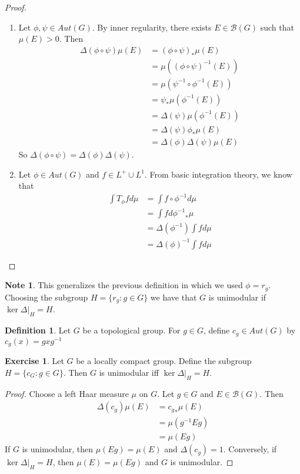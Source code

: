 \documentclass[12pt]{amsart}
\theoremstyle{definition}
\newtheorem{defn}[definition]{Definition}
\newtheorem{note}[definition]{Note}
\newtheorem{ex}[definition]{Exercise}
\newcommand{\Del}{\Delta}
\newcommand{\MB}{\mathcal{B}}
\begin{document}
	\begin{proof} \
		\begin{enumerate}
			\item Let $\phi, \psi \in Aut(G)$. By inner regularity, there exists $E \in \MB(G)$ such that $\mu(E) > 0$. Then 
			\begin{align*}
				\Del(\phi \circ \psi) \mu(E) 
				& = (\phi \circ \psi)_*\mu(E) \\
				& = \mu( (\phi \circ \psi)^{-1}(E) ) \\
				& = \mu(\psi^{-1} \circ \phi^{-1}(E)) \\
				& = \psi_* \mu(\phi^{-1}(E)) \\
				& = \Del(\psi) \mu(\phi^{-1}(E)) \\
				& = \Del(\psi) \phi_* \mu(E) \\
				& = \Del(\phi) \Del(\psi) \mu(E)
			\end{align*}
		So $\Del(\phi \circ \psi) = \Del(\phi) \Del(\psi)$.
			\item Let $\phi \in Aut(G)$ and $f \in L^+ \cup L^1$. From basic integration theory, we know that 
			\begin{align*}
				\int T_{\phi} f d \mu
				& = \int f \circ \phi^{-1} d \mu \\
				& = \int f d {\phi^{-1}}_* \mu \\
				& = \Del(\phi^{-1}) \int f d \mu \\
				& = \Del(\phi)^{-1} \int f d \mu
			\end{align*}
		\end{enumerate}
	\end{proof}
	
	\begin{note}
		This generalizes the previous definition in which we used $\phi = r_g$. Choosing the subgroup $H = \{r_g: g \in G\}$ we have that $G$ is unimodular if $\ker \Del|_H = H$. 
	\end{note}

	\begin{defn}
		Let $G$ be a topological group. For $g \in G$, define $c_g \in Aut(G)$ by $c_g(x) = gxg^{-1}$
	\end{defn}

	\begin{ex}
		Let $G$ be a locally compact group. Define the subgroup $H = \{c_G: g \in G\}$. Then $G$ is unimodular iff $\ker \Del|_H = H$.
	\end{ex}

	\begin{proof}
		Choose a left Haar measure $\mu$ on $G$. Let $g \in G$ and $E \in \MB(G)$. Then 
		\begin{align*}
			\Del(c_g)\mu(E) 
			& = {c_g}_* \mu(E) \\
			& = \mu(g^{-1}Eg) \\
			& = \mu(Eg)
		\end{align*} If $G$ is unimodular, then $\mu(Eg) = \mu(E)$ and $\Del(c_g) = 1$. Conversely, if $\ker \Del|_H = H$, then $\mu(E) = \mu(Eg)$ and $G$ is unimodular.
	\end{proof}
	
\end{document}
